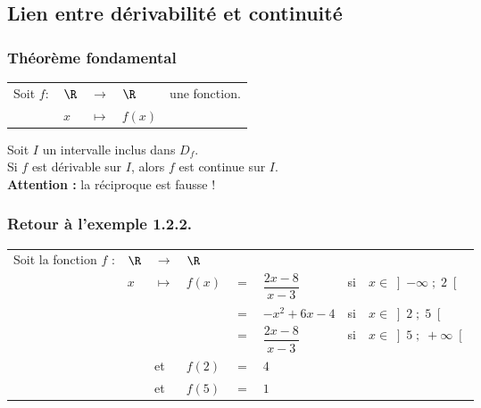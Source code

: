 \vspace*{-5cm}

\newpage

\vspace*{-2cm}

\subsection{Lien entre dérivabilité et continuité}

\subsubsection{Théorème fondamental}

\begin{tabular}{lllll}
Soit $f:$ & $\R$ & $\longrightarrow$ & $\R$ & une fonction. \\
& $x$ & $\longmapsto$ & $f(x)$ & \\
\end{tabular}

\vspace*{.3cm}

Soit $I$ un intervalle inclus dans $D_f$. \\

Si $f$ est dérivable sur $I$, alors $f$ est continue sur $I$. \\

\textbf{Attention :} la réciproque est fausse !

\subsubsection{Retour à l'exemple 1.2.2.}

\begin{tabular}{llllllll}
Soit la fonction $f$ : & $\R$ & $\longrightarrow$ & $\R$ & & & & \\
& $x$ & $\longmapsto$ & $f\left(x\right)$ & $ = $ & $ \dfrac{2x - 8}{x-3}$ & si & $x \in \left]-\infty \; ; \; 2\right[$ \vspace*{.3cm} \\
& & & & $=$ & $-x^2 + 6x - 4$ &  si & $x \in \left]2 \; ; \; 5\right[$ \vspace*{.3cm} \\
& & & & $=$ & $\dfrac{2x - 8}{x-3}$ &  si & $x \in \left]5 \; ; \; +\infty\right[$ \vspace*{.3cm} \\
& & et & $f(2)$ & $ = $ & $4$ & & \\
& & et & $f(5)$ & $ = $ & $1$ & & \\
\end{tabular}

